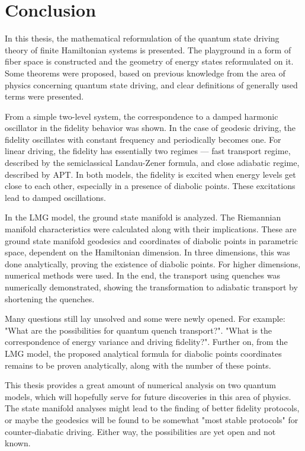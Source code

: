 \chapter*{Conclusion}
In this thesis, the mathematical reformulation of the quantum state driving theory of finite Hamiltonian systems is presented. The playground in a form of fiber space is constructed and the geometry of energy states reformulated on it. Some theorems were proposed, based on previous knowledge from the area of physics concerning quantum state driving, and clear definitions of generally used terms were presented.

From a simple two-level system, the correspondence to a damped harmonic oscillator in the fidelity behavior was shown. In the case of geodesic driving, the fidelity oscillates with constant frequency and periodically becomes one. For linear driving, the fidelity has essentially two regimes — fast transport regime, described by the semiclassical Landau-Zener formula, and close adiabatic regime, described by APT. In both models, the fidelity is excited when energy levels get close to each other, especially in a presence of diabolic points. These excitations lead to damped oscillations.

In the LMG model, the ground state manifold is analyzed. The Riemannian manifold characteristics were calculated along with their implications. These are ground state manifold geodesics and coordinates of diabolic points in parametric space, dependent on the Hamiltonian dimension. In three dimensions, this was done analytically, proving the existence of diabolic points. For higher dimensions, numerical methods were used. In the end, the transport using quenches was numerically demonstrated, showing the transformation to adiabatic transport by shortening the quenches.

Many questions still lay unsolved and some were newly opened. For example: "What are the possibilities for quantum quench transport?". "What is the correspondence of energy variance and driving fidelity?". Further on, from the LMG model, the proposed analytical formula for diabolic points coordinates remains to be proven analytically, along with the number of these points.

This thesis provides a great amount of numerical analysis on two quantum models, which will hopefully serve for future discoveries in this area of physics. The state manifold analyses might lead to the finding of better fidelity protocols, or maybe the geodesics will be found to be somewhat "most stable protocols" for counter-diabatic driving. Either way, the possibilities are yet open and not known.